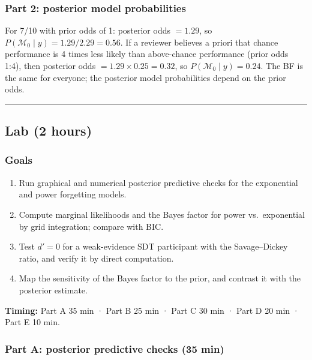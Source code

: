 \subsubsection{Part 2: posterior model probabilities}

For 7/10 with prior odds of 1: posterior odds \(= 1.29\), so
\(P(\mathcal{M}_0 \mid y) = 1.29 / 2.29 = 0.56\). If a reviewer believes
a priori that chance performance is 4 times less likely than
above-chance performance (prior odds 1:4), then posterior odds
\(= 1.29 \times 0.25 = 0.32\), so \(P(\mathcal{M}_0 \mid y) = 0.24\).
The BF is the same for everyone; the posterior model probabilities
depend on the prior odds.

\begin{center}\rule{0.5\linewidth}{0.5pt}\end{center}


\subsection{Lab (2 hours)}

\subsubsection{Goals}

\begin{enumerate}
\def\labelenumi{\arabic{enumi}.}
\tightlist
\item
  Run graphical and numerical posterior predictive checks for the
  exponential and power forgetting models.
\item
  Compute marginal likelihoods and the Bayes factor for power
  vs.~exponential by grid integration; compare with BIC.
\item
  Test \(d' = 0\) for a weak-evidence SDT participant with the
  Savage--Dickey ratio, and verify it by direct computation.
\item
  Map the sensitivity of the Bayes factor to the prior, and contrast it
  with the posterior estimate.
\end{enumerate}

\textbf{Timing:} Part A 35 min · Part B 25 min · Part C 30 min · Part D
20 min · Part E 10 min.

\subsubsection{Part A: posterior predictive checks (35 min)}

